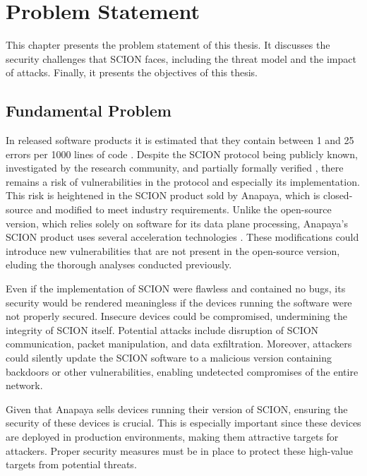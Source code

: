 \chapter{Problem Statement}
\label{ch:problem}

This chapter presents the problem statement of this thesis.
It discusses the security challenges that SCION faces, including the threat model and the impact of attacks.
Finally, it presents the objectives of this thesis.

\section{Fundamental Problem}
\label{sec:fundamental-problem}
In released software products it is estimated that they contain between 1 and 25 errors per 1000 lines of code \cite{McConnell2004}.
Despite the SCION protocol being publicly known, investigated by the research community, and partially formally verified \cite[7, 22, 23]{Perrig2022}, there remains a risk of vulnerabilities in the protocol and especially its implementation.
This risk is heightened in the SCION product sold by Anapaya, which is closed-source and modified to meet industry requirements.
Unlike the open-source version, which relies solely on software for its data plane processing, Anapaya's SCION product uses several acceleration technologies \cite{anapayaPerformanceOptimizations}.
These modifications could introduce new vulnerabilities that are not present in the open-source version, eluding the thorough analyses conducted previously.

Even if the implementation of SCION were flawless and contained no bugs, its security would be rendered meaningless if the devices running the software were not properly secured.
Insecure devices could be compromised, undermining the integrity of SCION itself.
Potential attacks include disruption of SCION communication, packet manipulation, and data exfiltration.
Moreover, attackers could silently update the SCION software to a malicious version containing backdoors or other vulnerabilities, enabling undetected compromises of the entire network.

Given that Anapaya sells devices running their version of SCION, ensuring the security of these devices is crucial.
This is especially important since these devices are deployed in production environments, making them attractive targets for attackers.
Proper security measures must be in place to protect these high-value targets from potential threats.



